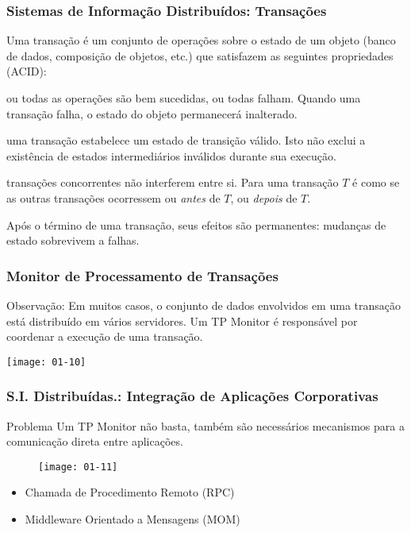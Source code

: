 \documentclass[Ligatures=TeX,table,brazil,svgnames,usetotalslideindicator,compress,10pt]{beamer}
\begin{document}
\begin{frame}
  \frametitle{Sistemas de Informação Distribuídos: Transações}

  Uma transação é um conjunto de operações sobre o estado de um objeto (banco de dados, composição de objetos, etc.) que satisfazem as seguintes propriedades (\alert{ACID}):

  \begin{description}[<+->]
  \item[Atomicidade] ou todas as operações são bem sucedidas, ou todas falham. Quando uma transação falha, o estado do objeto permanecerá inalterado.
  \item[Consistência] uma transação estabelece um estado de transição válido. Isto não exclui a existência de estados intermediários inválidos durante sua execução.
  \item[Isolamento] transações concorrentes não interferem entre
    si. Para uma transação $T$ é como se as outras transações
    ocorressem ou \emph{antes} de $T$, ou \emph{depois} de $T$.
  \item[Durabilidade] Após o término de uma transação, seus efeitos são permanentes: mudanças de estado sobrevivem a falhas.
  \end{description}
  
\end{frame}

\begin{frame}
  \frametitle{Monitor de Processamento de Transações}
  
  \begin{block}{Observação:}
    Em muitos casos, o conjunto de dados envolvidos em uma transação está distribuído em vários servidores. Um \alert{TP Monitor} é responsável por coordenar a execução de uma transação.
  \end{block}

  \texttt{[image: 01-10]}

\end{frame}

\begin{frame}
  \frametitle{S.I. Distribuídas.: Integração de Aplicações Corporativas}

  \begin{block}{Problema}
    Um TP Monitor não basta, também são necessários mecanismos para a comunicação direta entre aplicações.
  \end{block}
 
  \begin{figure}
    \centering
    \texttt{[image: 01-11]}
  \end{figure}
  
  \begin{itemize}
  \item \alert{Chamada de Procedimento Remoto} (RPC)
  \item \alert{Middleware Orientado a Mensagens} (MOM)
  \end{itemize}

\end{frame}
\end{document}
